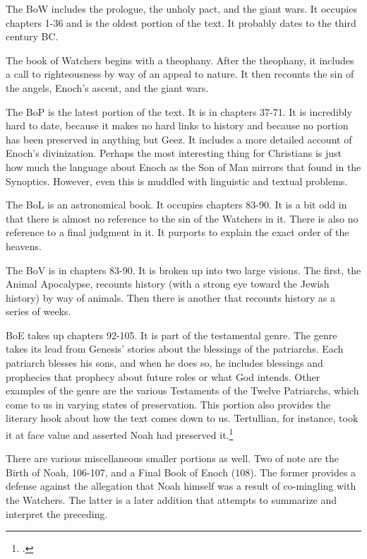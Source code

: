 \documentclass{article}
\begin{document}
The BoW includes the prologue, the unholy pact, and the giant wars.
It occupies chapters 1-36 and is the oldest portion of the text.
It probably dates to the third century BC.

The book of Watchers begins with a theophany.
After the theophany, it includes a call to righteousness by way of an appeal to nature.
It then recounts the sin of the angels, Enoch's ascent, and the giant wars.

The BoP is the latest portion of the text.
It is in chapters 37-71.
It is incredibly hard to date, because it makes no hard links to history and because no portion has been preserved in anything but Geez.
It includes a more detailed account of Enoch's divinization.
Perhaps the most interesting thing for Christians is just how much the language about Enoch as the Son of Man mirrors that found in the Synoptics.
However, even this is muddled with linguistic and textual problems.

The BoL is an astronomical book.
It occupies chapters 83-90.
It is a bit odd in that there is almost no reference to the sin of the Watchers in it.
There is also no reference to a final judgment in it.
It purports to explain the exact order of the heavens.

The BoV is in chapters 83-90.
It is broken up into two large visions.
The first, the Animal Apocalypse, recounts history (with a strong eye toward the Jewish history) by way of animals.
Then there is another that recounts history as a series of weeks.

BoE takes up chapters 92-105.
It is part of the testamental genre.
The genre takes its lead from Genesis' stories about the blessings of the patriarchs.
Each patriarch blesses his sons, and when he does so, he includes blessings and prophecies that prophecy about future roles or what God intends.
Other examples of the genre are the various Testaments of the Twelve Patriarchs, which come to us in varying states of preservation.
This portion also provides the literary hook about how the text comes down to us.
Tertullian, for instance, took it at face value and asserted Noah had preserved it.\footcite[1.3.1-3]{SchaffATertAppWom}

There are various miscellaneous smaller portions as well.
Two of note are the Birth of Noah, 106-107, and a Final Book of Enoch (108).
The former provides a defense against the allegation that Noah himself was a result of co-mingling with the Watchers.
The latter is a later addition that attempts to summarize and interpret the preceding.
\end{document}
